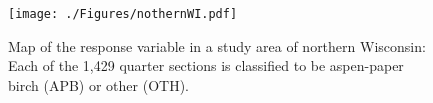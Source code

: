\documentclass[authoryear,review, 12pt]{elsarticle}
\begin{document}
\begin{figure}[!htbp]
\begin{center}
\texttt{[image: ./Figures/nothernWI.pdf]}
\end{center}
\caption{Map of the response variable in a study area of northern Wisconsin: Each of the 1,429 quarter sections is classified to be aspen-paper birch (APB) or other (OTH).}
\label{fig:data}
\end{figure}
\end{document}
